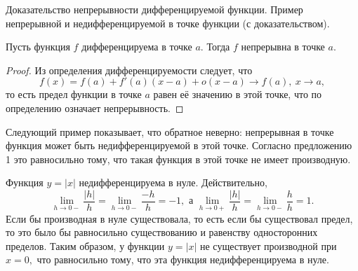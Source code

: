 \newpage

\begin{problem}
Доказательство непрерывности дифференцируемой функции. Пример непрерывной и недифференцируемой в точке функции (с доказательством).
\end{problem}

\begin{proposition}
    Пусть функция $f$ дифференцируема
    в точке $a.$ Тогда $f$ непрерывна в точке $a.$
\end{proposition}
\begin{proof}
    Из определения дифференцируемости следует, что
    $$
        f(x)=f(a)+f'(a)(x-a)+o(x-a)\rightarrow f(a), \
        x\rightarrow a,
    $$
    то есть предел функции в точке $a$ равен
    её значению в этой точке, что по определению
    означает непрерывность.
\end{proof}
Следующий пример показывает, что обратное
неверно: непрерывная в точке функция может
быть недифференцируемой в этой точке.
Согласно предложению 1 это равносильно
тому, что такая функция в этой точке не имеет производную.
\begin{example}
    Функция $y=|x|$ недифференцируема в нуле.
    Действительно,
    $$
        \lim\limits_{h\to 0-}
        \frac{|h|}{h}=\lim\limits_{h\to 0-}
        \frac{-h}{h}=-1, \textrm{ а }
        \lim\limits_{h\to 0+}
        \frac{|h|}{h}=
        \lim\limits_{h\to 0-}
        \frac{h}{h}=1.
    $$
    Если бы производная
    в нуле существовала, то есть если бы
    существовал предел, то это было бы равносильно
    существованию и равенству односторонних пределов.
    Таким образом, у функции $y=|x|$
    не существует производной при $x=0,$ что равносильно
    тому, что эта функция недифференцируема в нуле.
\end{example}

\newpage


